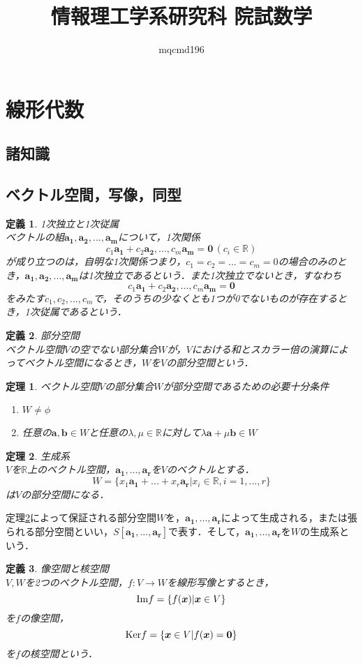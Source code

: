 \documentclass[uplatex]{jsarticle}
\title{情報理工学系研究科 院試数学}
\author{mqcmd196}
\newtheorem{definition}{定義}
\newtheorem{theorem}{定理}
\begin{document}
\section{線形代数}

\subsection{諸知識}

\subsection{ベクトル空間，写像，同型}
\begin{definition}
    \label{def:1次独立と1次従属}
    1次独立と1次従属\\
    ベクトルの組$\bm{a_1}, \bm{a_2}, ..., \bm{a_m}$について，1次関係$$c_1\bm{a_1} + c_2\bm{a_2}, ..., c_m\bm{a_m} = \bm{0} \, (c_i \in \mathbb{R})$$が成り立つのは，自明な1次関係つまり，$c_1 = c_2 = ... = c_m = 0$の場合のみのとき，$\bm{a_1}, \bm{a_2}, ..., \bm{a_m}$は1次独立であるという．また1次独立でないとき，すなわち$$c_1\bm{a_1} + c_2\bm{a_2}, ..., c_m\bm{a_m} = \bm{0}$$をみたす$c_1, c_2, ..., c_m$で，そのうちの少なくとも1つが0でないものが存在するとき，1次従属であるという．
\end{definition}

\begin{definition}
    部分空間\\
    ベクトル空間$V$の空でない部分集合$W$が，$V$における和とスカラー倍の演算によってベクトル空間になるとき，$W$を$V$の部分空間という．
\end{definition}

\begin{theorem}
    ベクトル空間$V$の部分集合$W$が部分空間であるための必要十分条件
    \begin{enumerate}
        \item $W \neq \phi$
        \item 任意の$\bm{a}, \bm{b} \in W$と任意の$\lambda, \mu \in \mathbb{R}$に対して$\lambda\bm{a} + \mu\bm{b} \in W$
    \end{enumerate}
\end{theorem}

\begin{theorem}
    \label{thm:生成系}
    生成系\\
    $V$を$\mathbb{R}$上のベクトル空間，$\bm{a_1}, ..., \bm{a_r}$を$V$のベクトルとする．$$W = \{x_1\bm{a_1} + ... + x_r\bm{a_r} | x_i \in \mathbb{R}, i = 1, ... , r\}$$は$V$の部分空間になる．
\end{theorem}

定理\ref{thm:生成系}によって保証される部分空間$W$を，$\bm{a_1}, ... , \bm{a_r}$によって生成される，または張られる部分空間といい，$S[\bm{a_1}, ..., \bm{a_r}]$で表す．そして，$\bm{a_1}, ..., \bm{a_r}$を$W$の生成系という．

\begin{definition}
    像空間と核空間\\
    $V, W$を2つのベクトル空間，$f:V \to W$を線形写像とするとき，$${\rm Im} f = \{f(\bm{x}) | \bm{x} \in V\}$$を$f$の像空間，$${\rm Ker} f = \{\bm{x} \in V | f(\bm{x}) = \bm{0}\}$$を$f$の核空間という．
\end{definition}
\end{document}
